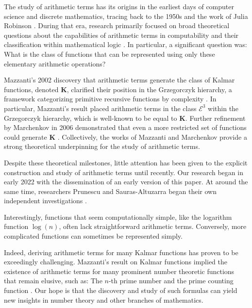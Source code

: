 \documentclass[10pt]{article}
\theoremstyle{plain}
\begin{document}
The study of arithmetic terms has its origins in the earliest days of computer science and discrete mathematics, tracing back to the 1950s and the work of Julia Robinson \cite{robinson1952arithmetic}. During that era, research primarily focused on broad theoretical questions about the capabilities of arithmetic terms in computability and their classification within mathematical logic \cite{herman1969elementary, grzegorczyk1953someclasses, robinson1952arithmetic}. In particular, a significant question was: What is the class of functions that can be represented using only these elementary arithmetic operations?

Mazzanti's 2002 discovery that arithmetic terms generate the class of Kalmar functions, denoted $\textbf{K}$, clarified their position in the Grzegorczyk hierarchy, a framework categorizing primitive recursive functions by complexity \cite{mazzanti2002plainbases, grzegorczyk1953someclasses}. In particular, Mazzanti's result placed arithmetic terms in the class $\mathcal{E}^3$ within the Grzegorczyk hierarchy, which is well-known to be equal to $\textbf{K}$. Further refinement by Marchenkov in 2006 demonstrated that even a more restricted set of functions could generate $\textbf{K}$ \cite{marchenkov2007superposition}. Collectively, the works of Mazzanti and Marchenkov provide a strong theoretical underpinning for the study of arithmetic terms.

Despite these theoretical milestones, little attention has been given to the explicit construction and study of arithmetic terms until recently. Our research began in early 2022 with the dissemination of an early version of this paper. At around the same time, researchers Prunescu and Sauras-Altuzarra began their own independent investigations \cite{prunescu2024factorial,prunescu2024representation}.

Interestingly, functions that seem computationally simple, like the logarithm function $\log(n)$, often lack straightforward arithmetic terms. Conversely, more complicated functions can sometimes be represented simply.

Indeed, deriving arithmetic terms for many Kalmar functions has proven to be exceedingly challenging. Mazzanti's result on Kalmar functions \cite{mazzanti2002plainbases} implied the existence of arithmetic terms for many prominent number theoretic functions that remain elusive, such as: The $n$-th prime number and the prime counting function \cite{prunescu2024factorial}. Our hope is that the discovery and study of such formulas can yield new insights in number theory and other branches of mathematics.
\end{document}
